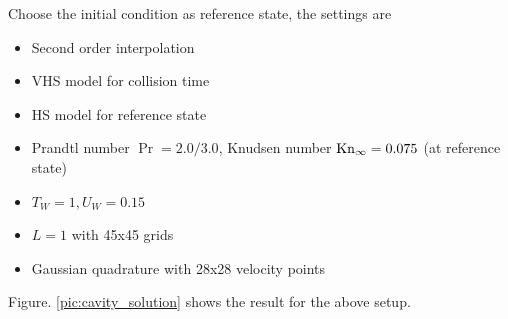 \documentclass[a4paper]{book}
\begin{document}
Choose the initial condition as reference state, the settings are
\begin{itemize}
    \item Second order interpolation
    \item VHS model for collision time
    \item HS model for reference state
    \item Prandtl number $\Pr=2.0/3.0$, Knudsen number ${\rm Kn}_\infty=0.075$ (at reference state)
    \item $T_W=1, U_W=0.15$
    \item $L=1$ with 45x45 grids
    \item Gaussian quadrature with 28x28 velocity points
\end{itemize}

Figure. \ref{pic:cavity_solution} shows the result for the above setup.
\end{document}

